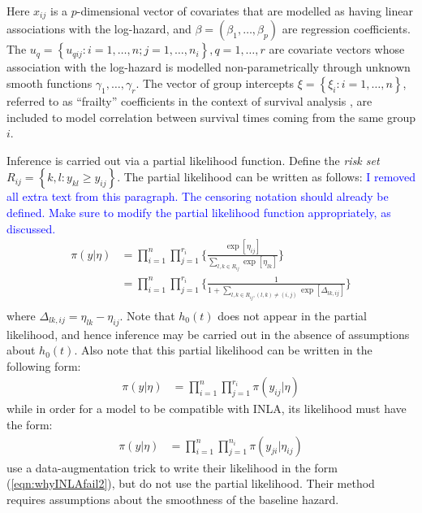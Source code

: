 \documentclass[]{article}
\newcommand{\alex}[1]{\textcolor{blue}{#1}}
\begin{document}
Here $x_{ij}$ is a $p$-dimensional vector of covariates that are modelled as having linear associations with the log-hazard, and $\beta = (\beta_{1},\ldots,\beta_{p})$ are regression coefficients. The $u_{q} = \left\{u_{qij}: i = 1,\ldots,n; j = 1,\ldots,n_{i} \right\}, q = 1,\ldots,r$ are covariate vectors whose association with the log-hazard is modelled non-parametrically through unknown smooth functions $\gamma_1,\ldots,\gamma_r$. The vector of group intercepts $\xi = \left\{ \xi_{i}: i=1,\ldots,n\right\}$, referred to as ``frailty'' coefficients in the context of survival analysis \citep{frailty}, are included to model correlation between survival times coming from the same group $i$.

Inference is carried out via a partial likelihood function. Define the \textit{risk set} $R_{ij} = \left\{k,l : y_{kl} \geq y_{ij}\right\}$. The partial likelihood can be written as follows: \alex{I removed all extra text from this paragraph. The censoring notation should already be defined. Make sure to modify the partial likelihood function appropriately, as discussed.}
\begin{equation}\begin{aligned}\label{eqn:partial}
\pi(y|\eta) &= \prod_{i=1}^{n}\prod_{j=1}^{r_{i}} \bigg\{\frac{\exp[\eta_{ij}]}{{\sum_{l,k\in R_{ij}}^{}\exp[\eta_{lk}]}}\bigg \} \\
&= \prod_{i=1}^{n}\prod_{j=1}^{r_{i}} \bigg\{\frac{1}{{1 + \sum_{l,k\in R_{ij} , (l,k) \neq (i,j)}\exp[\Delta_{lk,ij}]}}\bigg \} \\
\end{aligned}\end{equation}
where $\Delta_{lk,ij} = \eta_{lk} - \eta_{ij}$. Note that $h_{0}(t)$ does not appear in the partial likelihood, and hence inference may be carried out in the absence of assumptions about $h_{0}(t)$. Also note that this partial likelihood can be written in the following form:
\begin{equation}\begin{aligned}\label{eqn:whyINLAfail1}
\pi(y|\eta) &= \prod_{i=1}^{n}\prod_{j=1}^{r_{i}} \pi(y_{ij}|\eta)
\end{aligned}\end{equation}
while in order for a model to be compatible with INLA, its likelihood must have the form:
\begin{equation}\begin{aligned}\label{eqn:whyINLAfail2}
\pi(y|\eta) &= \prod_{i=1}^{n}\prod_{j=1}^{n_{i}} \pi(y_{ji}|\eta_{ij})
\end{aligned}\end{equation}
\citet{inlacoxph} use a data-augmentation trick to write their likelihood in the form (\ref{eqn:whyINLAfail2}), but do not use the partial likelihood. Their method requires assumptions about the smoothness of the baseline hazard.
\end{document}
